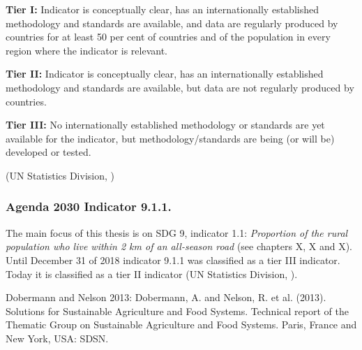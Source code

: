 	            \medskip
	            \begin{tcolorbox}
    				\textbf{Tier I:} Indicator is conceptually clear, has an internationally established methodology and standards are available, and data are regularly produced by countries for at least 50 per cent of countries and of the population in every region where the indicator is relevant.
    				\medskip
    				
    				\textbf{Tier II:} Indicator is conceptually clear, has an internationally established methodology and standards are available, but data are not regularly produced by countries.
    				\medskip
    				
    				\textbf{Tier III:} No internationally established methodology or standards are yet available for the indicator, but methodology/standards are being (or will be) developed or tested.
    				
    				\begin{center}
    				    (UN Statistics Division, \citeyear{unitednationsstatisticsdivision2019b})
    				\end{center}
			    \end{tcolorbox}
	            
	            
	            
	            \medskip
	            
	            
	            
	            
	            
	            
	       \subsubsection{Agenda 2030 Indicator 9.1.1.}
	            
	            The main focus of this thesis is on SDG 9, indicator 1.1: \textit{Proportion of the rural population who live within 2 km of an all-season road} (see chapters X, X and X). Until December 31 of 2018 indicator 9.1.1 was classified as a tier III indicator. Today it is classified as a tier II indicator (UN Statistics Division, \citeyear{unitednationsstatisticsdivision2019b}). 
	            
	            \medskip
	            
	            
	            Dobermann and Nelson 2013: Dobermann, A. and Nelson, R. et al. (2013). Solutions for Sustainable Agriculture and Food Systems. Technical report of the Thematic Group on Sustainable Agriculture and Food Systems. Paris, France and New York, USA: SDSN.
	            
